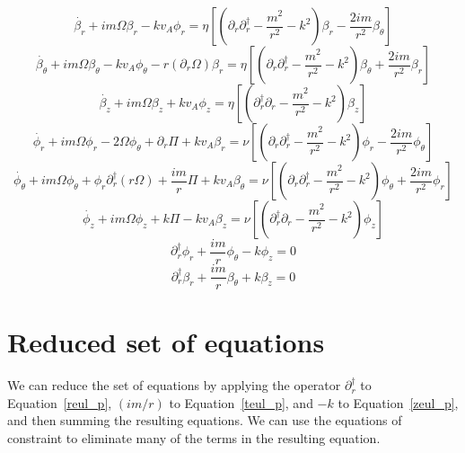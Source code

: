 \documentclass[letterpaper]{article}
\begin{document}
\begin{equation}\label{rind_p}
\dot{\beta_r} + im\Omega\beta_r - kv_A\phi_r = \eta\left[\left(\partial_r \partial_r^\dagger - \frac{m^2}{r^2} - k^2\right)\beta_r - \frac{2im}{r^2}\beta_\theta\right]
\end{equation}
\begin{equation}\label{tind_p}
\dot{\beta_\theta} + im\Omega\beta_\theta - kv_A \phi_\theta - r(\partial_r \Omega)\beta_r = \eta\left[\left(\partial_r \partial_r^\dagger - \frac{m^2}{r^2} - k^2\right)\beta_\theta + \frac{2im}{r^2}\beta_r\right]
\end{equation}
\begin{equation}\label{zind_p}
\dot{\beta_z} + im\Omega\beta_z + kv_A \phi_z = \eta\left[\left(\partial_r^\dagger \partial_r -\frac{m^2}{r^2} - k^2\right)\beta_z\right]
\end{equation}
\begin{equation}\label{reul_p}
\dot{\phi_r} + im\Omega\phi_r - 2\Omega\phi_\theta + \partial_r \Pi + kv_A\beta_r = \nu\left[\left(\partial_r \partial_r^\dagger - \frac{m^2}{r^2} - k^2\right)\phi_r - \frac{2im}{r^2}\phi_\theta\right]
\end{equation}
\begin{equation}\label{teul_p}
\dot{\phi_\theta} + im\Omega\phi_\theta + \phi_r \partial_r^\dagger(r\Omega) + \frac{im}{r}\Pi + kv_A \beta_\theta = \nu\left[\left(\partial_r \partial_r^\dagger - \frac{m^2}{r^2} - k^2\right)\phi_\theta + \frac{2im}{r^2}\phi_r\right]
\end{equation}
\begin{equation}\label{zeul_p}
\dot{\phi_z} + im\Omega{\phi_z} + k\Pi - kv_A \beta_z = \nu\left[\left(\partial_r^\dagger \partial_r - \frac{m^2}{r^2} - k^2\right)\phi_z\right]
\end{equation}
\begin{equation}\label{inc_p}
\partial_r^\dagger \phi_r + \frac{im}{r}\phi_\theta - k\phi_z = 0
\end{equation}
\begin{equation}\label{delB_p}
\partial_r^\dagger \beta_r + \frac{im}{r}\beta_\theta + k\beta_z = 0
\end{equation}

\section{Reduced set of equations}

We can reduce the set of equations by applying the operator
$\partial_r^\dagger$ to Equation~\ref{reul_p}, $(im/r)$
to Equation~\ref{teul_p}, and $-k$ to Equation~\ref{zeul_p},
and then summing the resulting equations.  We can use the equations of
constraint to eliminate many of the terms in the resulting equation.
\end{document}
